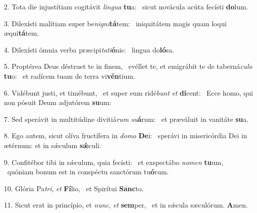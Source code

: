 2. Tota die injustítiam cogitávit \textit{lin}\textit{gua} \textbf{tu}a: \ast\  sicut novácula acúta fecísti \textbf{do}lum.\

3. Dilexísti malítiam super be\textit{ni}\textit{gni}\textbf{tá}tem: \ast\  iniquitátem magis quam loqui æqui\textbf{tá}tem.\

4. Dilexísti ómnia verba præcipi\textit{ta}\textit{ti}\textbf{ó}nis: \ast\  lingua do\textbf{ló}sa.\

5. Proptérea Deus déstruet te in finem, \dag\  evéllet te, et emigrábit te de taberná\textit{cu}\textit{lo} \textbf{tu}o: \ast\  et radícem tuam de terra vi\textbf{vén}tium.\

6. Vidébunt justi, et timébunt, \dag\  et super eum ridé\textit{bunt} \textit{et} \textbf{di}cent: \ast\  Ecce homo, qui non pósuit Deum adjutórem \textbf{su}um:\

7. Sed sperávit in multitúdine divitiá\textit{rum} \textit{su}\textbf{á}rum: \ast\  et præváluit in vanitáte \textbf{su}a.\

8. Ego autem, sicut olíva fructífera in \textit{do}\textit{mo} \textbf{De}i: \ast\  sperávi in misericórdia Dei in ætérnum: et in sǽculum \textbf{sǽ}culi.\

9. Confitébor tibi in sǽculum, quia fecísti: \dag\  et exspectábo \textit{no}\textit{men} \textbf{tu}um, \ast\  quóniam bonum est in conspéctu sanctórum tu\textbf{ó}rum.\

10. Glória Pa\textit{tri}, \textit{et} \textbf{Fí}lio, \ast\  et Spirítui \textbf{Sanc}to.\

11. Sicut erat in princípio, et \textit{nunc}, \textit{et} \textbf{sem}per, \ast\  et in sǽcula sæculórum. \textbf{A}men.\

